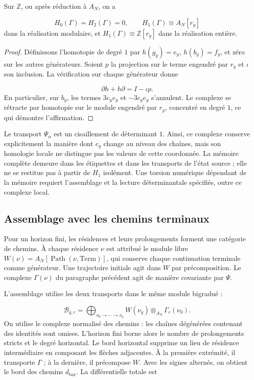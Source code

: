 \begin{proposition}
\label{x_reciprocidad:iv:cont:memoria-homologia}
Sur \(\mathbb Z\), ou après réduction à \(A_N\), on a

\[
H_0(\Gamma)=H_2(\Gamma)=0,
\qquad H_1(\Gamma)\cong A_N[r_y]
\]
dans la réalisation modulaire, et \(H_1(\Gamma)\cong\mathbb Z[r_y]\) dans la réalisation entière.

\end{proposition}
\begin{proof}
Définissons l'homotopie de degré \(1\) par \(h(g_y)=e_y\), \(h(b_y)=f_y\), et zéro sur les autres générateurs. Soient \(p\) la projection sur le terme engendré par \(r_y\) et \(\iota\) son inclusion. La vérification sur chaque générateur donne

\[
\partial h+h\partial=I-\iota p.
\]
En particulier, sur \(b_y\), les termes \(3c_ye_y\) et \(-3c_ye_y\) s'annulent. Le complexe se rétracte par homotopie sur le module engendré par \(r_y\), concentré en degré \(1\), ce qui démontre l'affirmation.
\end{proof}

Le transport \(\Psi_\alpha\) est un cisaillement de déterminant \(1\). Ainsi, ce complexe conserve explicitement la manière dont \(c_y\) change au niveau des chaînes, mais son homologie locale ne distingue pas les valeurs de cette coordonnée. La mémoire complète demeure dans les étiquettes et dans les transports de l'état source ; elle ne se restitue pas à partir de \(H_1\) isolément. Une torsion numérique dépendant de la mémoire requiert l'assemblage et la lecture déterminantale spécifiés, outre ce complexe local.

\subsection{Assemblage avec les chemins terminaux}
\label{x_reciprocidad:iv:cont:ensamblaje}
Pour un horizon fini, les résidences et leurs prolongements forment une catégorie de chemins. À chaque résidence \(\nu\) est attribué le module libre \(W(\nu)=A_N[\operatorname{Path}(\nu,\mathrm{Term})]\), qui conserve chaque continuation terminale comme générateur. Une trajectoire initiale agit dans \(W\) par précomposition. Le complexe \(\Gamma(\nu)\) du paragraphe précédent agit de manière covariante par \(\Psi\).

L'assemblage utilise les deux transports dans le même module bigradué :

\[
\mathcal B_{q,r}=
\bigoplus_{\nu_0\to\cdots\to\nu_q}
W(\nu_q)\otimes_{A_N}\Gamma_r(\nu_0).
\]
On utilise le complexe normalisé des chemins : les chaînes dégénérées contenant des identités sont omises. L'horizon fini borne alors le nombre de prolongements stricts et le degré horizontal. Le bord horizontal supprime un lieu de résidence intermédiaire en composant les flèches adjacentes. À la première extrémité, il transporte \(\Gamma\) ; à la dernière, il précompose \(W\). Avec les signes alternés, on obtient le bord des chemins \(d_{\mathrm{bar}}\). La différentielle totale est


